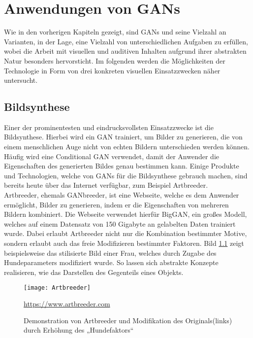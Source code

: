 \chapter{Anwendungen von GANs}

\noindent Wie in den vorherigen Kapiteln gezeigt, sind GANs und seine Vielzahl an Varianten, in der Lage, eine Vielzahl von unterschiedlichen Aufgaben zu erfüllen, wobei die Arbeit mit visuellen und auditiven Inhalten aufgrund ihrer abstrakten Natur besonders hervorsticht. Im folgenden werden die Möglichkeiten der Technologie in Form von drei konkreten visuellen Einsatzzwecken näher untersucht. \\

\section{Bildsynthese}

\noindent Einer der prominentesten und eindrucksvollsten Einsatzzwecke ist die Bildsynthese. Hierbei wird ein GAN trainiert, um Bilder zu generieren, die von einem menschlichen Auge nicht von echten Bildern unterschieden werden können. Häufig wird eine Conditional GAN verwendet, damit der Anwender die Eigenschaften des generierten Bildes genau bestimmen kann. Einige Produkte und Technologien, welche von GANs für die Bildsynthese gebrauch machen, sind bereits heute über das Internet verfügbar, zum Beispiel Artbreeder. \\

\noindent Artbreeder, ehemals GANbreeder, ist eine Webseite, welche es dem Anwender ermöglicht, Bilder zu generieren, indem er die Eigenschaften von mehreren Bildern kombiniert. Die Webseite verwendet hierfür BigGAN, ein großes Modell, welches auf einem Datensatz von 150 Gigabyte an gelabelten Daten trainiert wurde. Dabei erlaubt Artbreeder nicht nur die Kombination bestimmter Motive, sondern erlaubt auch das freie Modifizieren bestimmter Faktoren. Bild \ref{fig:artbreeder} zeigt beispielsweise das stilisierte Bild einer Frau, welches durch Zugabe des Hundeparameters modifiziert wurde. So lassen sich abstrakte Konzepte realisieren, wie das Darstellen des Gegenteils eines Objekts. 

\newpage

\begin{figure}[H]
    \centering
    \texttt{[image: Artbreeder]}
    \caption{Demonstration von Artbreeder und Modifikation des Originals(links) durch Erhöhung des „Hundefaktors“} \quelle\url{https://www.artbreeder.com}
\label{fig:artbreeder}
\end{figure}


